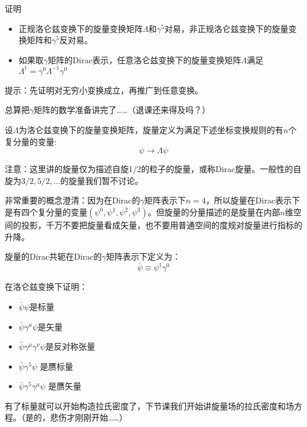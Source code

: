 \documentclass[CJK]{beamer}
\begin{document}
\begin{frame}
\bch
证明
\begin{itemize}
\item{正规洛仑兹变换下的旋量变换矩阵$\Lambda$和$\gamma^5$对易，非正规洛仑兹变换下的旋量变换矩阵和$\gamma^5$反对易。}
\item{如果取$\gamma$矩阵的Dirac表示，任意洛仑兹变换下的旋量变换矩阵$\Lambda$满足$\Lambda^\dagger = \gamma^0 \Lambda^{-1}\gamma^0$}
\end{itemize}

\skipline

提示：先证明对无穷小变换成立，再推广到任意变换。
\ech
\end{frame}


\begin{frame}
\bch

总算把$\gamma$矩阵的数学准备讲完了……（退课还来得及吗？）

\ech
\end{frame}




\begin{frame}
\bch
设$\Lambda$为洛仑兹变换下的旋量变换矩阵，旋量定义为满足下述坐标变换规则的有$n$个复分量的变量:
$$\psi \rightarrow \Lambda \psi$$

\skipline
注意：这里讲的旋量仅为描述自旋1/2的粒子的旋量，或称Dirac旋量。一般性的自旋为$3/2,5/2,...$的旋量我们暂不讨论。

\skipline
非常重要的概念澄清：因为在Dirac的$\gamma$矩阵表示下$n=4$，所以旋量在Dirac表示下是有四个复分量的变量$(\psi^0,\psi^1, \psi^2, \psi^3)$。但旋量的分量描述的是旋量在内部$n$维空间的投影，千万不要把旋量看成矢量，也不要用普通空间的度规对旋量进行指标的升降。
\ech
\end{frame}


\begin{frame}
\bch
旋量的Dirac共轭在Dirac的$\gamma$矩阵表示下定义为：
$$\bar\psi \equiv \psi^\dagger \gamma^0$$

在洛仑兹变换下证明：
\begin{itemize}
\item{$\bar\psi \psi$是标量}
\item{$\bar\psi\gamma^\mu\psi$是矢量}
\item{$\bar\psi\gamma^\mu\gamma^\nu\psi$是反对称张量}
\item{$\bar\psi\gamma^5\psi$ 是赝标量}
\item{$\bar\psi\gamma^5\gamma^\mu\psi$ 是赝矢量}
\end{itemize}

\ech
\end{frame}

\begin{frame}
\bch
有了标量就可以开始构造拉氏密度了，下节课我们开始讲旋量场的拉氏密度和场方程。（是的，悲伤才刚刚开始……）
\ech
\end{frame}
\end{document}
